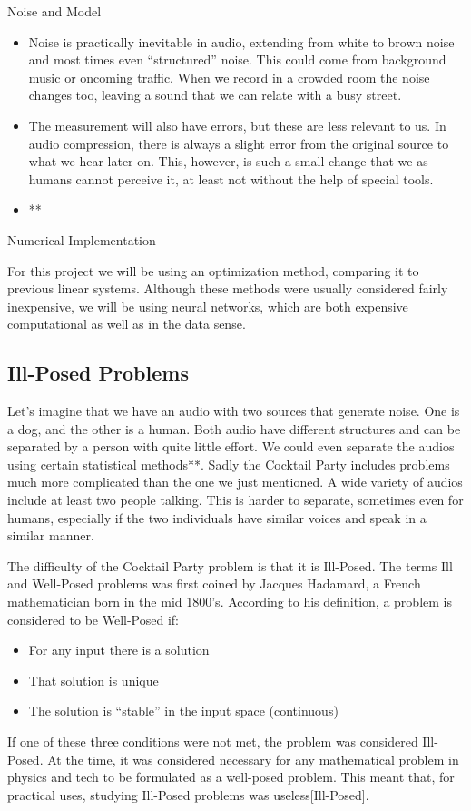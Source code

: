 \documentclass{book}
\begin{document}
\begin{center}
    \noindent Noise and Model
\end{center}
\begin{itemize}
    \item Noise is practically inevitable in audio, extending from white to brown noise and most times even “structured” noise.
    This could come from background music or oncoming traffic.
    When we record in a crowded room the noise changes too, leaving a sound that we can relate with a busy street.

    \item The measurement will also have errors, but these are less relevant to us.
    In audio compression, there is always a slight error from the original source to what we hear later on.
    This, however, is such a small change that we as humans cannot perceive it, at least not without the help of special tools.

    \item **
\end{itemize}
\begin{center}
Numerical Implementation
\end{center}
    For this project we will be using an optimization method, comparing it to previous linear systems.
    Although these methods were usually considered fairly inexpensive, we will be using neural networks, which are both expensive computational as well as in the data sense. 


\subsection{Ill-Posed Problems}
\qquad Let's imagine that we have an audio with two sources that generate noise.
One is a dog, and the other is a human.
Both audio have different structures and can be separated by a person with quite little effort.
We could even separate the audios using certain statistical methods**.
Sadly the Cocktail Party includes problems much more complicated than the one we just mentioned.
A wide variety of audios include at least two people talking.
This is harder to separate, sometimes even for humans, especially if the two individuals have similar voices and speak in a similar manner.
\par
    The difficulty of the Cocktail Party problem is that it is Ill-Posed.
    The terms Ill and Well-Posed problems was first coined by Jacques Hadamard, a French mathematician born in the mid 1800’s.
    According to his definition, a problem is considered to be Well-Posed if: 
\begin{itemize}
    \item For any input there is a solution
    \item That solution is unique
    \item The solution is “stable” in the input space (continuous)
\end{itemize}
If one of these three conditions were not met, the problem was considered Ill-Posed.
At the time, it was considered necessary for any mathematical problem in physics and tech to be formulated as a well-posed problem.
This meant that, for practical uses, studying Ill-Posed problems was useless[Ill-Posed].
\end{document}
